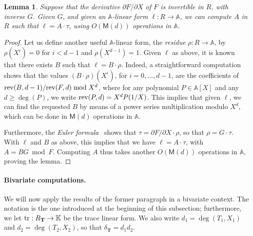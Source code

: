 \documentclass[12pt]{article}
\def\K {\ensuremath{\mathbb{K}}}
\def\A {\ensuremath{\mathbb{A}}}
\def\M {\ensuremath{\mathsf{M}}}
\def\Tt {\ensuremath{\mathbf{T}}}
\newtheorem{Lemma}{Lemma}
\begin{document}
\begin{Lemma}\label{lemma:trdeg}
  Suppose that the derivative $\partial F/\partial X$ of $F$ is
  invertible in $R$, with inverse $G$. Given $G$, and given an
  $\A$-linear form $\ell: R \to \A$, we can compute $A$ in $R$ such
  that $\ell=A \cdot \tau$, using $O(\M(d))$ operations in $\A$.
\end{Lemma}
\begin{proof}
  Let us define another useful $\A$-linear form, the {\em residue}
  $\rho: R \to \A$, by $\rho(X^i)=0$ for $i < d-1$ and
  $\rho(X^{d-1})=1$. Given $\ell$ as above, it is known that there
  exists $B$ such that $\ell=B \cdot \rho$. Indeed, a straightforward
  computation shows that the values $(B \cdot \rho)(X^i)$, for
  $i=0,\dots,d-1$, are the coefficients of ${\rm rev}(B,d-1)/{\rm
    rev}(F,d) \bmod X^{d}$, where for any polynomial $P\in \A[X]$ and
  any $d \ge \deg(P)$, we write ${\rm rev}(P,d)=X^d P(1/X)$. This
  implies that given $\ell$, we can find the requested $B$ by means of
  a power series multiplication modulo $X^d$, which can be done in
  $\M(d)$ operations in $\A$.
  
  Furthermore, the {\em Euler formula}~\cite[Proposition
    2.4]{Demazure87} shows that $\tau = \partial F/\partial X \cdot
  \rho$, so that $\rho = G \cdot \tau$. With $\ell$ and $B$ as above,
  this implies that we have $\ell = A \cdot \tau$, with $A=B G \bmod
  F$. Computing $A$ thus takes another $O(\M(d))$ operations in $\A$,
  proving the lemma.
\end{proof}


\paragraph{Bivariate computations.} We will now apply the results 
of the former paragraph in a bivariate context. The notation is the
one introduced at the beginning of this subsection; furthermore, we
let ${\rm tr}:R_\Tt \to \K$ be the trace linear form. We also write
$d_1=\deg(T_1,X_1)$ and $d_2=\deg(T_2,X_2)$, so that $\delta_\Tt=d_1
d_2$.
\end{document}
